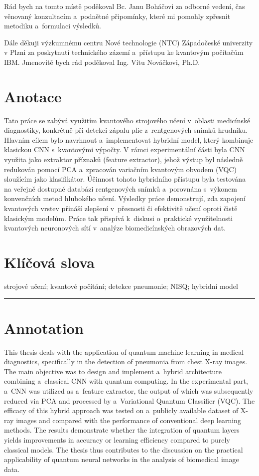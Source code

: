 \documentclass[12pt, a4paper]{report}
\begin{document}
Rád bych na tomto místě poděkoval Bc. Janu Boháčovi za odborné vedení,
čas věnovaný konzultacím a~podnětné připomínky, které mi pomohly zpřesnit
metodiku a~formulaci výsledků.

Dále děkuji výzkumnému centru Nové technologie (NTC) Západočeské univerzity
v Plzni za poskytnutí technického zázemí a~přístupu ke kvantovým počítačům
IBM. Jmenovitě bych rád poděkoval Ing. Vítu Nováčkovi, Ph.D.


\newpage
\thispagestyle{empty}

\section*{Anotace}
Tato práce se zabývá využitím kvantového strojového učení v~oblasti medicínské diagnostiky, konkrétně při detekci zápalu plic z~rentgenových snímků hrudníku.
Hlavním cílem bylo navrhnout a~implementovat hybridní model, který kombinuje klasickou CNN s~kvantovými výpočty.
V rámci experimentální části byla CNN využita jako extraktor příznaků (feature extractor), jehož výstup byl následně redukován pomocí PCA a~zpracován variačním kvantovým obvodem (VQC) sloužícím jako klasifikátor.
Účinnost tohoto hybridního přístupu byla testována na veřejně dostupné databázi rentgenových snímků a~porovnána s~výkonem konvenčních metod hlubokého učení.
Výsledky práce demonstrují, zda zapojení kvantových vrstev přináší zlepšení v~přesnosti či efektivitě učení oproti čistě klasickým modelům.
Práce tak přispívá k~diskusi o~praktické využitelnosti kvantových neuronových sítí v~analýze biomedicínských obrazových dat.

\section*{Klíčová slova}
strojové učení; kvantové počítání; detekce pneumonie; NISQ; hybridní model

\vspace{1cm}
\hrule
\vspace{1cm}

\section*{Annotation}
This thesis deals with the application of quantum machine learning in medical diagnostics, specifically in the detection of pneumonia from chest X-ray images.
The main objective was to design and implement a~hybrid architecture combining a~classical CNN with quantum computing.
In the experimental part, a~CNN was utilized as a~feature extractor, the output of which was subsequently reduced via PCA and processed by a~Variational Quantum Classifier (VQC).
The efficacy of this hybrid approach was tested on a~publicly available dataset of X-ray images and compared with the performance of conventional deep learning methods.
The results demonstrate whether the integration of quantum layers yields improvements in accuracy or learning efficiency compared to purely classical models.
The thesis thus contributes to the discussion on the practical applicability of quantum neural networks in the analysis of biomedical image data.
\end{document}
